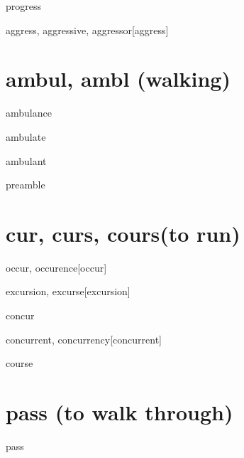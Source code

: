 \begin{RefWord}{progress}
\end{RefWord}

\begin{RefWord}{aggress, aggressive, aggressor}[aggress]
\end{RefWord}

\section{ambul, ambl (walking)}
\begin{RefWord}{ambulance}
\end{RefWord}

\begin{RefWord}{ambulate}
\end{RefWord}

\begin{RefWord}{ambulant}
\end{RefWord}

\begin{RefWord}{preamble}
\end{RefWord}

\section{cur, curs, cours(to run)}

\begin{RefWord}{occur, occurence}[occur]
\end{RefWord}

\begin{RefWord}{excursion, excurse}[excursion]
\end{RefWord}


\begin{RefWord}{concur}
    
\end{RefWord}

\begin{RefWord}{concurrent, concurrency}[concurrent]
\end{RefWord}

\begin{RefWord}{course}
\end{RefWord}

\section{pass (to walk through)}

\begin{RefWord}{pass}
\end{RefWord}

